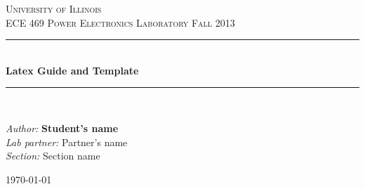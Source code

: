 \thispagestyle{empty}
\begin{titlepage}
\begin{center}



\textsc{\LARGE University of Illinois}\\[1.5cm]

\textsc{\Large ECE 469 Power Electronics Laboratory Fall 2013}\\[0.5cm]


\newcommand{\HRule}{\rule{\linewidth}{0.5mm}}
\HRule \\[0.4cm]
{ \huge \bfseries Latex Guide and Template}\\[0.4cm]

\HRule \\[1.5cm]

\begin{minipage}{0.6\textwidth}
\begin{flushright} \large
\emph{Author:} \textbf{Student's name}	\\
\emph{Lab partner:} Partner's name	\\
\emph{Section:} Section name 
\end{flushright}
\end{minipage}

\vfill

{\large \today}

\end{center}

\end{titlepage}